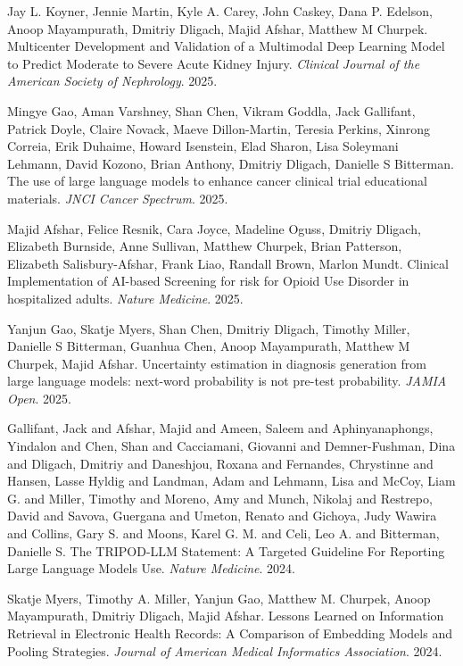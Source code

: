 \documentclass[letterpaper]{article}
\renewenvironment{itemize}{
  \begin{list}{}{
    \setlength{\leftmargin}{1.5em}
  }
}{
  \end{list}
}
\begin{document}
\begin{itemize}
\item Jay L. Koyner, Jennie Martin, Kyle A. Carey, John Caskey, Dana P. Edelson, Anoop Mayampurath, Dmitriy Dligach, Majid Afshar, Matthew M Churpek. Multicenter Development and Validation of a Multimodal Deep Learning Model to Predict Moderate to Severe Acute Kidney Injury. \emph{Clinical Journal of the American Society of Nephrology}. 2025.
\item Mingye Gao, Aman Varshney, Shan Chen, Vikram Goddla, Jack Gallifant, Patrick Doyle, Claire Novack, Maeve Dillon-Martin, Teresia Perkins, Xinrong Correia, Erik Duhaime, Howard Isenstein, Elad Sharon, Lisa Soleymani Lehmann, David Kozono, Brian Anthony, Dmitriy Dligach, Danielle S Bitterman. The use of large language models to enhance cancer clinical trial educational materials. \emph{JNCI Cancer Spectrum}. 2025.
\item Majid Afshar, Felice Resnik, Cara Joyce, Madeline Oguss, Dmitriy Dligach, Elizabeth Burnside, Anne Sullivan, Matthew Churpek, Brian Patterson, Elizabeth Salisbury-Afshar, Frank Liao, Randall Brown, Marlon Mundt. Clinical Implementation of AI-based Screening for risk for Opioid Use Disorder in hospitalized adults. \emph{Nature Medicine}. 2025.
\item Yanjun Gao, Skatje Myers, Shan Chen, Dmitriy Dligach, Timothy Miller, Danielle S Bitterman, Guanhua Chen, Anoop Mayampurath, Matthew M Churpek, Majid Afshar. Uncertainty estimation in diagnosis generation from large language models: next-word probability is not pre-test probability. \emph{JAMIA Open}. 2025.
\item Gallifant, Jack and Afshar, Majid and Ameen, Saleem and Aphinyanaphongs, Yindalon and Chen, Shan and Cacciamani, Giovanni and Demner-Fushman, Dina and Dligach, Dmitriy and Daneshjou, Roxana and Fernandes, Chrystinne and Hansen, Lasse Hyldig and Landman, Adam and Lehmann, Lisa and McCoy, Liam G. and Miller, Timothy and Moreno, Amy and Munch, Nikolaj and Restrepo, David and Savova, Guergana and Umeton, Renato and Gichoya, Judy Wawira and Collins, Gary S. and Moons, Karel G. M. and Celi, Leo A. and Bitterman, Danielle S. The TRIPOD-LLM Statement: A Targeted Guideline For Reporting Large Language Models Use. \emph{Nature Medicine}. 2024.
\item Skatje Myers, Timothy A. Miller, Yanjun Gao, Matthew M. Churpek, Anoop Mayampurath, Dmitriy Dligach, Majid Afshar. Lessons Learned on Information Retrieval in Electronic Health Records: A Comparison of Embedding Models and Pooling Strategies. \emph{Journal of American Medical Informatics Association}. 2024.

\end{itemize}
\end{document}
